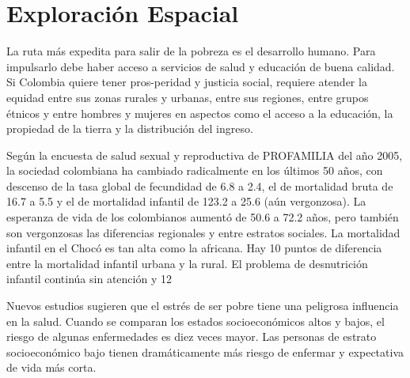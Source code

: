 \section{Exploración Espacial}\label{espacial}

La ruta más expedita para salir de la pobreza es el desarrollo humano. Para impulsarlo debe haber acceso a servicios de salud y educación de buena calidad. Si Colombia quiere tener pros-peridad y justicia social, requiere atender la equidad entre sus zonas rurales y urbanas, entre sus regiones, entre grupos étnicos y entre hombres y mujeres en aspectos como el acceso a la educación, la propiedad de la tierra y la distribución del ingreso.


Según la encuesta de salud sexual y reproductiva de PROFAMILIA del año 2005, la sociedad colombiana ha cambiado radicalmente en los últimos 50 años, con descenso de la tasa global de fecundidad de 6.8 a 2.4, el de mortalidad bruta de 16.7 a 5.5 y el de mortalidad infantil de 123.2 a 25.6 (aún vergonzosa). La esperanza de vida de los colombianos aumentó de 50.6 a 72.2 años, pero también son vergonzosas las diferencias regionales y entre estratos sociales. La mortalidad infantil en el Chocó es tan alta como la africana. Hay 10 puntos de diferencia entre la mortalidad infantil urbana y la rural. El problema de desnutrición infantil continúa sin atención y 12%


Nuevos estudios sugieren que el estrés de ser pobre tiene una peligrosa influencia en la salud. Cuando se comparan los estados socioeconómicos altos y bajos, el riesgo de algunas enfermedades es diez veces mayor. Las personas de estrato socioeconómico bajo tienen dramáticamente más riesgo de enfermar y expectativa de vida más corta.


